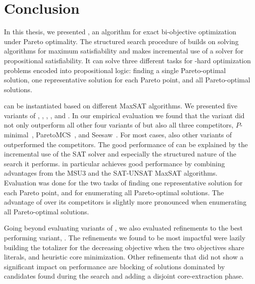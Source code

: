 \chapter{Conclusion\label{chap:conclusion}}

In this thesis, we presented \algname{}, an algorithm for exact bi-objective optimization under Pareto optimality.
The structured search procedure of \algname{} builds on solving algorithms for maximum satisfiability and makes incremental use of a solver for propositional satisfiability.
It can solve three different tasks for \NP-hard optimization problems encoded into propositional logic:
finding a single Pareto-optimal solution, one representative solution for each Pareto point, and all Pareto-optimal solutions.

\algname{} can be instantiated based on different MaxSAT algorithms.
We presented five variants of \algname{}, \satunsat{}, \unsatsat{}, \msu{}, \oll{} and \msh{}.
In our empirical evaluation we found that the \msh{} variant did not only outperform all other four variants of \algname{} but also all three competitors, $P$-minimal~\autocite{DBLP:conf/cp/SohBTB17}, ParetoMCS~\autocite{DBLP:conf/ijcai/Terra-NevesLM18a}, and Seesaw~\autocite{DBLP:conf/cp/JanotaMSM21}.
For most cases, also other variants of \algname{} outperformed the competitors.
The good performance of \algname{} can be explained by the incremental use of the SAT solver and especially the structured nature of the search it performs.
\msh{} in particular achieves good performance by combining advantages from the MSU3 and the SAT-UNSAT MaxSAT algorithms.
Evaluation was done for the two tasks of finding one representative solution for each Pareto point, and for enumerating all Pareto-optimal solutions.
The advantage of \algname{} over its competitors is slightly more pronounced when enumerating all Pareto-optimal solutions.

Going beyond evaluating variants of \algname{}, we also evaluated refinements to the best performing variant, \msh{}.
The refinements we found to be most impactful were lazily building the totalizer for the decreasing objective when the two objectives share literals, and heuristic core minimization.
Other refinements that did not show a significant impact on performance are blocking of solutions dominated by candidates found during the search and adding a disjoint core-extraction phase.

